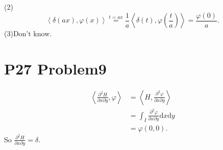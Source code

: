 \documentclass[a4paper]{ctexart}
\newcommand{\dif}{\mathrm{d}}
\newcommand{\pdfFrac}[2]{\frac{\partial #1}{\partial #2}}
\newcommand{\innerprod}[2]{\left<#1,#2\right>}
\begin{document}
(2)
\begin{equation}
    \innerprod{\delta(ax)}{\varphi(x)}\overset{t=ax}{=}\frac{1}{a}\innerprod{\delta(t)}{\varphi(\frac{t}{a})}=\frac{\varphi(0)}{a}.
\end{equation}
(3)Don't know.
\section*{P27 Problem9}
\begin{equation}
    \begin{aligned}
        \innerprod{\pdfFrac{^{2}H}{x\partial y}}{\varphi}&=\innerprod{H}{\pdfFrac{^{2}\varphi}{x\partial y}}\\
        &=\int_{I}\pdfFrac{^{2}\varphi}{x\partial y}\dif x\dif y\\
        &=\varphi(0,0).
    \end{aligned}
\end{equation}
So $\pdfFrac{^{2}H}{x\partial y}=\delta$.
\end{document}
